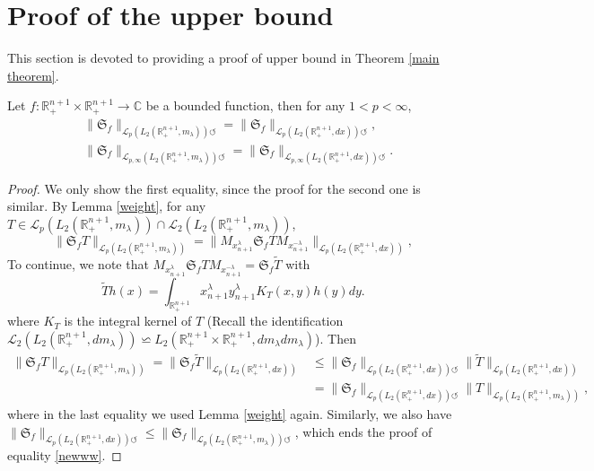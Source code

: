 \documentclass[12pt]{amsart}
\begin{document}
\section{Proof of the upper bound}\label{upper bound section}
\setcounter{equation}{0}

This section is devoted to providing a proof of upper bound in Theorem \ref{main theorem}.
{\color{blue}
\begin{lemma}\label{schurweight}
Let $f:\mathbb{R}_+^{n+1}\times \mathbb{R}_+^{n+1}\rightarrow \mathbb{C}$ be a bounded function, then for any $1<p<\infty$,
\begin{align}\label{newww}
&\Big\|\mathfrak{S}_{f}\Big\|_{\mathcal{L}_{p}(L_2(\mathbb{R}^{n+1}_+,m_{\lambda}))\circlearrowleft}=\Big\|\mathfrak{S}_{f}\Big\|_{\mathcal{L}_{p}(L_2(\mathbb{R}^{n+1}_+,dx))\circlearrowleft},\\
&\Big\|\mathfrak{S}_{f}\Big\|_{\mathcal{L}_{p,\infty}(L_2(\mathbb{R}^{n+1}_+,m_{\lambda}))\circlearrowleft}=\Big\|\mathfrak{S}_{f}\Big\|_{\mathcal{L}_{p,\infty}(L_2(\mathbb{R}^{n+1}_+,dx))\circlearrowleft}\nonumber.
\end{align}
\end{lemma}
\begin{proof}
We only show the first equality, since the proof for the second one is similar. By Lemma \ref{weight}, for any $T\in \mathcal{L}_{p}(L_2(\mathbb{R}^{n+1}_+,m_{\lambda}))\cap \mathcal{L}_{2}(L_2(\mathbb{R}^{n+1}_+,m_{\lambda}))$,
$$\Big\|\mathfrak{S}_{f}T\Big\|_{\mathcal{L}_{p}(L_2(\mathbb{R}^{n+1}_+,m_{\lambda}))}=\Big\|M_{x_{n+1}^\lambda}\mathfrak{S}_{f}TM_{x_{n+1}^{-\lambda}}\Big\|_{\mathcal{L}_{p}(L_2(\mathbb{R}^{n+1}_+,dx))},$$
To continue, we note that $M_{x_{n+1}^\lambda}\mathfrak{S}_{f}TM_{x_{n+1}^{-\lambda}}=\mathfrak{S}_{f}\tilde{T}$ with
$$\tilde{T}h(x)=\int_{\mathbb{R}_+^{n+1}}x_{n+1}^\lambda y_{n+1}^\lambda K_T(x,y)h(y)dy.$$
where $K_T$ is the integral kernel of $T$ (Recall the identification $\mathcal{L}_2(L_2(\mathbb{R}_+^{n+1},dm_\lambda))\backsimeq L_2(\mathbb{R}_+^{n+1}\times \mathbb{R}_+^{n+1},dm_\lambda dm_\lambda)$). Then
\begin{align*}
\Big\|\mathfrak{S}_{f}T\Big\|_{\mathcal{L}_{p}(L_2(\mathbb{R}^{n+1}_+,m_{\lambda}))}=\|\mathfrak{S}_{f}\tilde{T}\|_{\mathcal{L}_{p}(L_2(\mathbb{R}^{n+1}_+,dx))}&\leq \|\mathfrak{S}_{f}\|_{\mathcal{L}_{p}(L_2(\mathbb{R}^{n+1}_+,dx))\circlearrowleft}\|\tilde{T}\|_{\mathcal{L}_{p}(L_2(\mathbb{R}^{n+1}_+,dx))}\\
&=\|\mathfrak{S}_{f}\|_{\mathcal{L}_{p}(L_2(\mathbb{R}^{n+1}_+,dx))\circlearrowleft}\|T\|_{\mathcal{L}_{p}(L_2(\mathbb{R}^{n+1}_+,m_\lambda))},
\end{align*}
where in the last equality we used Lemma \ref{weight} again. Similarly, we also have $\|\mathfrak{S}_{f}\|_{\mathcal{L}_{p}(L_2(\mathbb{R}^{n+1}_+,dx))\circlearrowleft}\leq \Big\|\mathfrak{S}_{f}\Big\|_{\mathcal{L}_{p}(L_2(\mathbb{R}^{n+1}_+,m_{\lambda}))\circlearrowleft}$, which ends the proof of equality \eqref{newww}.
\end{proof}
}
\end{document}
